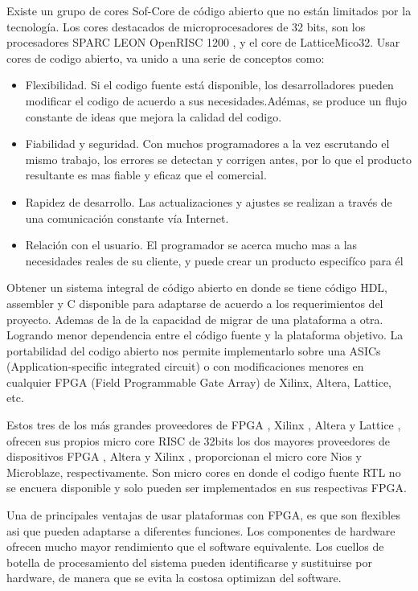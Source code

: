\documentclass[a4paper,11pt]{article}
\begin{document}
Existe un grupo de cores Sof-Core de código abierto que no están limitados por la tecnología. Los cores destacados de microprocesadores de 32 bits, son los procesadores SPARC LEON OpenRISC 1200 , y el core de LatticeMico32. Usar cores de  codigo abierto,  va unido a una serie de conceptos como:
 \begin {itemize}
\item Flexibilidad. Si el codigo fuente está disponible, los desarrolladores pueden modificar el codigo de acuerdo a sus necesidades.Adémas, se produce un flujo constante de ideas que mejora la calidad del codigo.
\item Fiabilidad y seguridad. Con muchos programadores a la vez escrutando el mismo trabajo, los errores se detectan y corrigen antes, por lo que el producto resultante es mas fiable y eficaz que el comercial.
\item Rapidez de desarrollo. Las actualizaciones y ajustes se realizan a través de una comunicación constante vía Internet.
\item Relación con el usuario. El programador se acerca mucho mas a las necesidades reales de su cliente, y puede crear un producto especifíco para él
 \end {itemize}
 
Obtener un sistema integral de código abierto en donde se tiene código HDL, assembler y C disponible para adaptarse de acuerdo a los requerimientos del proyecto. Ademas de la de la capacidad de migrar de una plataforma a otra. Logrando menor dependencia entre el código fuente y la plataforma objetivo. 
La portabilidad del codigo abierto nos permite implementarlo sobre una ASICs (Application-specific integrated circuit) o con modificaciones menores en cualquier FPGA (Field Programmable Gate Array) de Xilinx, Altera, Lattice, etc. 

Estos tres de los más grandes proveedores de FPGA , Xilinx , Altera y Lattice , ofrecen sus propios micro core RISC de 32bits los dos mayores proveedores de dispositivos FPGA , Altera y Xilinx , proporcionan el micro core Nios y Microblaze, respectivamente. Son micro cores  en donde el codigo fuente RTL no se encuera disponible y solo pueden ser implementados en sus respectivas FPGA.
 
Una de principales ventajas de usar plataformas con FPGA, es que son flexibles asi que pueden adaptarse a diferentes funciones. Los componentes de hardware ofrecen mucho mayor rendimiento que el software equivalente. Los cuellos de botella de procesamiento del sistema pueden identificarse y sustituirse por hardware, de manera que se evita la costosa optimizan del software.
\end{document}
